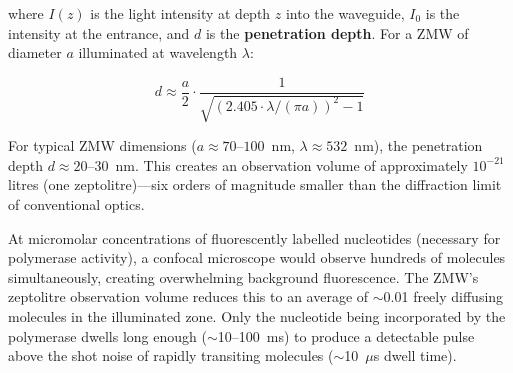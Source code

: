 where $I(z)$ is the light intensity at depth $z$ into the waveguide, $I_0$ is the intensity at the entrance, and $d$ is the \textbf{penetration depth}. For a ZMW of diameter $a$ illuminated at wavelength $\lambda$:

\begin{equation}
d \approx \frac{a}{2} \cdot \frac{1}{\sqrt{(2.405 \cdot \lambda / (\pi a))^2 - 1}}
\label{eq:longread:penetration}
\end{equation}

For typical ZMW dimensions ($a \approx 70$--$100$~nm, $\lambda \approx 532$~nm), the penetration depth $d \approx 20$--$30$~nm. This creates an observation volume of approximately $10^{-21}$ litres (one zeptolitre)---six orders of magnitude smaller than the diffraction limit of conventional optics.

\begin{keyconcept}[title={Why the ZMW Works}]
At micromolar concentrations of fluorescently labelled nucleotides (necessary for polymerase activity), a confocal microscope would observe hundreds of molecules simultaneously, creating overwhelming background fluorescence. The ZMW's zeptolitre observation volume reduces this to an average of $\sim$0.01 freely diffusing molecules in the illuminated zone. Only the nucleotide being incorporated by the polymerase dwells long enough ($\sim$10--100~ms) to produce a detectable pulse above the shot noise of rapidly transiting molecules ($\sim$10~$\mu$s dwell time).
\end{keyconcept}

